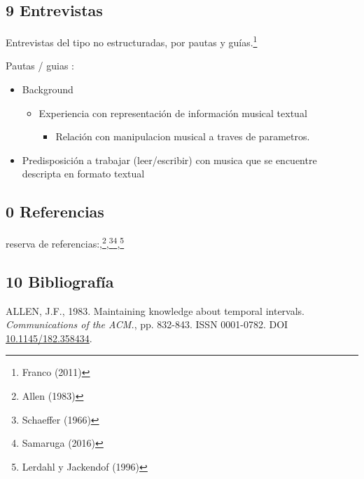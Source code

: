 \documentclass[]{article}
\providecommand{\tightlist}{%
  \setlength{\itemsep}{0pt}\setlength{\parskip}{0pt}}
\begin{document}
\newpage

\hypertarget{entrevistas}{%
\subsection{9 Entrevistas}\label{entrevistas}}

Entrevistas del tipo no estructuradas, por pautas y guías.\footnote{Franco
  (2011)}

Pautas / guias :

\begin{itemize}
\item
  Background

  \begin{itemize}
  \item
    Experiencia con representación de información musical textual

    \begin{itemize}
    \tightlist
    \item
      Relación con manipulacion musical a traves de parametros.
    \end{itemize}
  \end{itemize}
\item
  Predisposición a trabajar (leer/escribir) con musica que se encuentre
  descripta en formato textual
\end{itemize}

\newpage

\hypertarget{referencias}{%
\subsection{0 Referencias}\label{referencias}}

reserva de referencias:,\footnote{Allen (1983)},\footnote{Schaeffer
  (1966)}\footnote{Samaruga (2016)},\footnote{Lerdahl y Jackendof (1996)}

\newpage

\hypertarget{bibliografuxeda}{%
\subsection*{10 Bibliografía}\label{bibliografuxeda}}

\hypertarget{refs}{}
\leavevmode\hypertarget{ref-allen}{}%
ALLEN, J.F., 1983. Maintaining knowledge about temporal intervals.
\emph{Communications of the ACM.}, pp. 832-843. ISSN 0001-0782. DOI
\href{https://doi.org/10.1145/182.358434}{10.1145/182.358434}.
\end{document}
